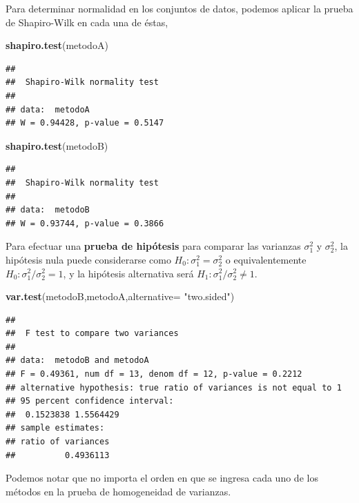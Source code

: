 \documentclass[
]{book}
\newenvironment{Shaded}{\begin{snugshade}}{\end{snugshade}}
\newcommand{\AttributeTok}[1]{\textcolor[rgb]{0.13,0.29,0.53}{#1}}
\newcommand{\FunctionTok}[1]{\textcolor[rgb]{0.13,0.29,0.53}{\textbf{#1}}}
\newcommand{\NormalTok}[1]{#1}
\newcommand{\StringTok}[1]{\textcolor[rgb]{0.31,0.60,0.02}{#1}}
\begin{document}
Para determinar normalidad en los conjuntos de datos, podemos aplicar la prueba de Shapiro-Wilk en cada una de éstas,

\begin{Shaded}
\begin{Highlighting}[]
\FunctionTok{shapiro.test}\NormalTok{(metodoA)}
\end{Highlighting}
\end{Shaded}

\begin{verbatim}
## 
##  Shapiro-Wilk normality test
## 
## data:  metodoA
## W = 0.94428, p-value = 0.5147
\end{verbatim}

\begin{Shaded}
\begin{Highlighting}[]
\FunctionTok{shapiro.test}\NormalTok{(metodoB)}
\end{Highlighting}
\end{Shaded}

\begin{verbatim}
## 
##  Shapiro-Wilk normality test
## 
## data:  metodoB
## W = 0.93744, p-value = 0.3866
\end{verbatim}

Para efectuar una \textbf{prueba de hipótesis} para comparar las varianzas \(\sigma_1^2\) y \(\sigma_2^2\), la hipótesis nula puede considerarse como \(H_0:\sigma_1^2 = \sigma_2^2\) o equivalentemente \(H_0:\sigma_1^2 / \sigma_2^2 =1\), y la hipótesis alternativa será \(H_1:\sigma_1^2/\sigma_2^2 \neq 1\).

\begin{Shaded}
\begin{Highlighting}[]
\FunctionTok{var.test}\NormalTok{(metodoB,metodoA,}\AttributeTok{alternative=} \StringTok{"two.sided"}\NormalTok{)}
\end{Highlighting}
\end{Shaded}

\begin{verbatim}
## 
##  F test to compare two variances
## 
## data:  metodoB and metodoA
## F = 0.49361, num df = 13, denom df = 12, p-value = 0.2212
## alternative hypothesis: true ratio of variances is not equal to 1
## 95 percent confidence interval:
##  0.1523838 1.5564429
## sample estimates:
## ratio of variances 
##          0.4936113
\end{verbatim}

Podemos notar que no importa el orden en que se ingresa cada uno de los métodos en la prueba de homogeneidad de varianzas.
\end{document}
